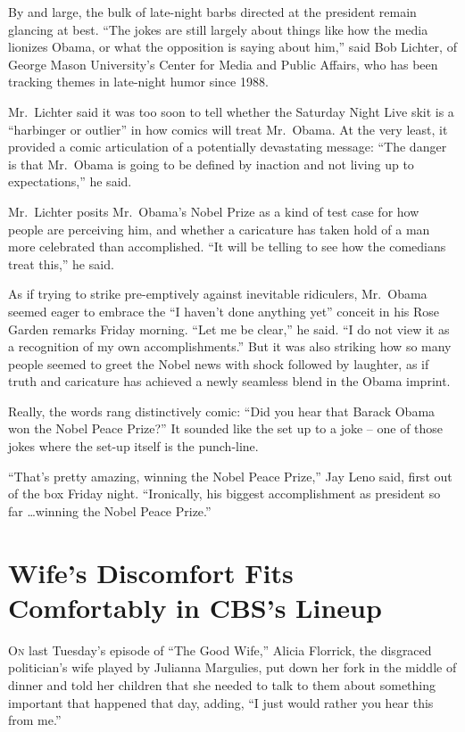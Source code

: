 ﻿\documentclass[12pt]{article}
\begin{document}
By and large, the bulk of late-night barbs directed at the president remain glancing at best. ``The
jokes are still largely about things like how the media lionizes Obama, or what the opposition is
saying about him,'' said Bob Lichter, of George Mason University's Center for Media and Public
Affairs, who has been tracking themes in late-night humor since 1988.

Mr.~Lichter said it was too soon to tell whether the Saturday Night Live skit is a
``harbinger\cite{harbinger} or outlier'' in how comics will treat Mr.~Obama. At the very least, it
provided a comic articulation\cite{articulation} of a potentially devastating message: ``The danger
is that Mr.~Obama is going to be defined by inaction and not living up to expectations,'' he said.

Mr.~Lichter posits Mr.~Obama's Nobel Prize as a kind of test case for how people are
perceiving\cite{perceive} him, and whether a caricature has taken hold of a man more celebrated than
accomplished. ``It will be telling to see how the comedians treat this,'' he said.

As if trying to strike pre-emptively against inevitable ridiculers, Mr.~Obama seemed eager to
embrace the ``I haven't done anything yet'' conceit in his Rose Garden remarks Friday morning. ``Let
me be clear,'' he said. ``I do not view it as a recognition of my own accomplishments.'' But it was
also striking how so many people seemed to greet the Nobel news with shock followed by laughter, as
if truth and caricature has achieved a newly seamless blend in the Obama imprint.

Really, the words rang distinctively comic: ``Did you hear that Barack Obama won the Nobel Peace
Prize?'' It sounded like the set up to a joke -- one of those jokes where the set-up itself is the
punch-line.

``That's pretty amazing, winning the Nobel Peace Prize,'' Jay Leno said, first out of the box Friday
night. ``Ironically, his biggest accomplishment as president so far \ldots winning the Nobel Peace
Prize.''

\section{Wife's Discomfort Fits Comfortably in CBS's Lineup}

\lettrine{O}{n} last Tuesday's episode of ``The Good Wife,'' Alicia
Florrick, the disgraced politician's wife played by Julianna Margulies, put down her fork in the
middle of dinner and told her children that she needed to talk to them about something important
that happened that day, adding, ``I just would rather you hear this from me.''
\end{document}

